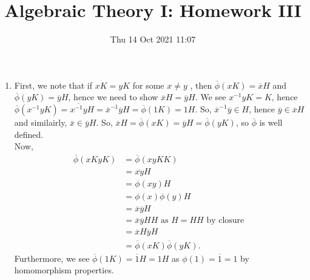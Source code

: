 \documentclass[a4paper]{article}
\title{Algebraic Theory I: Homework III}
\date{Thu 14 Oct 2021 11:07}
\begin{document}
\maketitle
\begin{solution}[1]
\begin{enumerate}
	\item First, we note that if \(xK = yK\) for some \(x \neq y\)  , then \(\overline{\phi}\left( xK \right) = \overline{x}H\) and \(\overline{\phi}\left( yK \right) = \overline{y}H\), hence we need to show \(\overline{x}H = \overline{y}H\). We see \(x^{-1}y K = K\), hence \(\overline{\phi}\left( x^{-1}yK \right) = \overline{x^{-1}y}H = \overline{x}^{-1} \overline{y} H = \overline{\phi}\left( 1K \right) = 1 H\). So, \(\overline{x}^{-1}\overline{y} \in H\), hence \(\overline{y} \in \overline{x}H\) and similairly, \(\overline{x} \in\overline{y}H\). So, \(\overline{x}H = \overline{\phi}\left( xK \right) = \overline{y}H = \overline{\phi}\left( yK \right) \), so \(\overline{\phi}\)  is well defined.\\
		Now,
		\begin{align*}
			\overline{\phi}\left( xK yK \right) &= \overline{\phi}\left( xyKK \right)  \\
			&=  \overline{xy} H\\
			&= \phi\left( xy \right) H\\
			&= \phi\left( x \right) \phi\left( y \right) H \\
			&= \overline{x} \overline{y} H\\
			&= \overline{x}\overline{y} H H \text{ as \(H = H H\) by closure }\\
		&= \overline{x} H \overline{y} H \\
		&= \overline{\phi}\left( xK \right) \overline{\phi}\left( yK \right)
		.\end{align*}
		Furthermore, we see \(\overline{\phi}\left( 1K \right) = \overline{1}H = 1H\) as \(\phi\left( 1 \right)  = \overline{1} = 1\)  by homomorphism properties.


\end{enumerate}
\end{solution}
\end{document}
